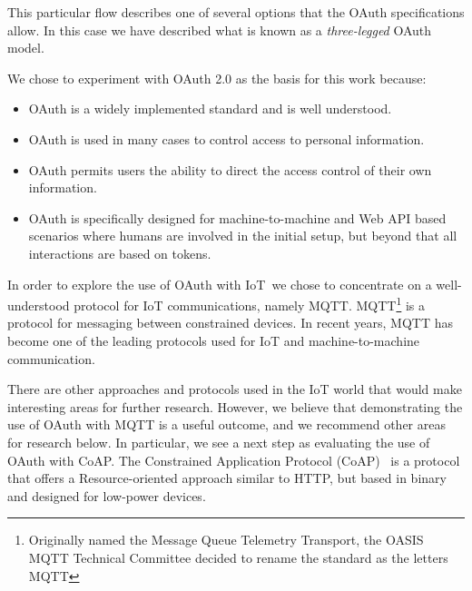 \documentclass{llncs}
\begin{document}
This particular flow describes one of several options that the OAuth specifications allow. In this 
case we have described what is known as a \emph{three-legged} OAuth model. 

We chose to experiment with OAuth 2.0 as the basis for this work because:
\begin{itemize}
\item OAuth is a widely implemented standard and is well understood.
\item OAuth is used in many cases to control access to personal information.
\item OAuth permits users the ability to direct the access control of their own information.
\item OAuth is specifically designed for machine-to-machine and Web API based scenarios where humans 
are involved in the initial setup, but beyond that all interactions are based on tokens.
\end{itemize}

In order to explore the use of OAuth with IoT\, we chose to concentrate on a well-understood protocol for IoT
communications, namely MQTT. MQTT\footnote{Originally named the Message Queue Telemetry Transport,
the OASIS MQTT Technical Committee decided to rename the standard as the 
letters MQTT}\cite{locke2010mq} is a protocol for messaging between constrained devices. 
In recent years, MQTT has become one of the leading protocols used for IoT and machine-to-machine communication.

There are other approaches and protocols used in the IoT world that
would make interesting areas for further research. However, we believe that demonstrating the use of OAuth
with MQTT is a useful outcome, and we recommend other areas for research below. In particular, we see a next
step as evaluating the use of OAuth with CoAP. The Constrained Application Protocol 
(CoAP)~\cite{shelby2013constrained} is a protocol 
that offers a Resource-oriented approach similar to HTTP, but based in binary and designed for low-power devices. 
\fi
\end{document}
